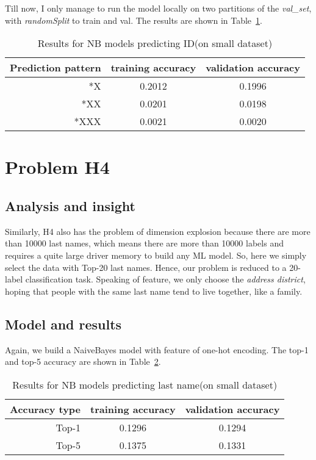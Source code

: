 \documentclass{article}
\begin{document}
Till now, I only manage to run the model locally on  two partitions of the \emph{val\_set}, with \emph{randomSplit} to train and val. The results are shown in Table~\ref{tab-3-1}.
\begin{table}[ht]
\centering
\caption{Results for NB models predicting ID(on small dataset)}
\label{tab-3-1}
\begin{tabular}{rcc}
\toprule
Prediction pattern & training accuracy & validation accuracy \\
\midrule
*X & 0.2012 & 0.1996 \\
*XX & 0.0201 & 0.0198 \\
*XXX & 0.0021 & 0.0020 \\
\bottomrule
\end{tabular}
\end{table}

\section{Problem H4}

\subsection{Analysis and insight}

Similarly, H4 also has the problem of dimension explosion because there are more than 10000 last names, which means there are more than 10000 labels and requires a quite large driver memory to build any ML model. So, here we simply select the data with Top-20 last names. Hence, our problem is reduced to a 20-label classification task. Speaking of feature, we only choose the \emph{address district}, hoping that people with the same last name tend to live together, like a family.

\subsection{Model and results}

Again, we build a NaiveBayes model with feature of one-hot encoding. The top-1 and top-5 accuracy are shown in Table~\ref{tab-4-1}.

\begin{table}[ht]
\centering
\caption{Results for NB models predicting last name(on small dataset)}
\label{tab-4-1}
\begin{tabular}{rcc}
\toprule
Accuracy type & training accuracy & validation accuracy \\
\midrule
Top-1 & 0.1296 & 0.1294 \\
Top-5 & 0.1375 & 0.1331 \\
\bottomrule
\end{tabular}
\end{table}












% 
% 
\end{document}
